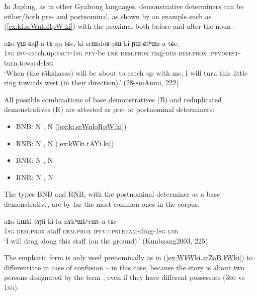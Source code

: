 In Japhug, as in other Gyalrong languages, demonstrative determiners can be either/both pre- and postnominal, as shown by an example such as (\ref{ex:ki.srWnloRpW.ki}) with the proximal  both before and after the noun .

\begin{exe}
\ex \label{ex:ki.srWnloRpW.ki}
 \gll aʑo ɣɯ-ɕaβ-a tɤ-ŋu tɕe, ki srɯnloʁ-pɯ ki ɲɯ-ɕtʰɯz-a tɕe,  \\
 \textsc{1sg} \textsc{inv}-catch.up:\textsc{fact}-\textsc{1sg} \textsc{pfv}-be \textsc{lnk} \textsc{dem}.\textsc{prox} ring-\textsc{dim} \textsc{dem}.\textsc{prox} \textsc{ipfv}:\textsc{west}-turn.toward-\textsc{1sg} \\
\glt `When (the râkshasas) will be about to catch up with me, I will  turn this little ring towards west (in their direction).' (28-smAnmi, 222)
\end{exe}

All possible combinations of base demonstratives (B) and reduplicated demonstratives (R) are attested as pre- or postnominal determiners:

\begin{itemize}
\item BNB:  N ,  N  (\ref{ex:ki.srWnloRpW.ki})
\item RNB:  N ,  N  (\ref{ex:kWki.tAYi.ki})
\item BNR:  N ,  N 
\item RNR:  N ,  N 
\end{itemize}  

The types BNB and RNB, with the postnominal determiner as a base demonstrative, are by far the most common ones in the corpus.

\begin{exe}
\ex \label{ex:kWki.tAYi.ki}
 \gll  aʑo kɯki tɤɲi ki lu-nɤkʰɯkʰrɯt-a tɕe \\
 \textsc{1sg} \textsc{dem}.\textsc{prox} staff \textsc{dem}.\textsc{prox} \textsc{ipfv}:\textsc{upstream}-drag-\textsc{1sg} \textsc{lnk} \\
 \glt `I will drag along this staff (on the ground).' (Kunbzang2003, 225)
\end{exe}

The emphatic form is only used prenominally as in (\ref{ex:WkWki.arZaB.kWki}) to differentiate in case of confusion -- in this case, because the story is about two persons designated by the term , even if they have different possessors (\textsc{3sg} vs \textsc{1sg}).

